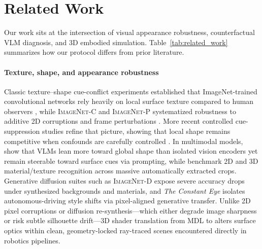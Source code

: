 \section{Related Work}
\label{sec:related}

Our work sits at the intersection of visual appearance robustness, counterfactual \textsc{VLM} diagnosis, and 3D embodied simulation. Table~\ref{tab:related_work} summarizes how our protocol differs from prior literature.

\begin{table}[!t]
\centering\scriptsize

\caption{Comparison between prior appearance-robustness, counterfactual-bias, and adversarial studies and our \textsc{ConvertAsset} material-conversion framework.}
\label{tab:related_work}
\end{table}

\paragraph{Texture, shape, and appearance robustness}
Classic texture--shape cue-conflict experiments established that ImageNet-trained convolutional networks rely heavily on local surface texture compared to human observers \citep{Geirhos2019Texture}, while \textsc{ImageNet-C} and \textsc{ImageNet-P} systematized robustness to additive 2D corruptions and frame perturbations \citep{Hendrycks2019Benchmarking}. More recent controlled cue-suppression studies refine that picture, showing that local shape remains competitive when confounds are carefully controlled \citep{Burgert2025NotTexture}. In multimodal models, \citet{Gavrikov2025Talk} show that \textsc{VLM}s lean more toward global shape than isolated vision encoders yet remain steerable toward surface cues via prompting, while \citet{Eppel2025Shape} benchmark 2D and 3D material/texture recognition across massive automatically extracted crops. Generative diffusion suites such as \textsc{ImageNet-D} \citep{Zhang2024ImageNetD} expose severe accuracy drops under synthesized backgrounds and materials, and \emph{The Constant Eye} \citep{Wang2026ConstantEye} isolates autonomous-driving style shifts via pixel-aligned generative transfer. Unlike 2D pixel corruptions or diffusion re-synthesis---which either degrade image sharpness or risk subtle silhouette drift---3D shader translation from \textsc{MDL} to \usdps{} alters surface optics within clean, geometry-locked ray-traced scenes encountered directly in robotics pipelines.

